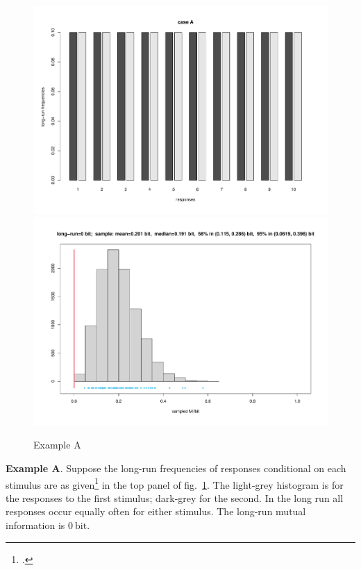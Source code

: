 \documentclass[\ifafour a4paper,12pt,\else a5paper,10pt,\fi%
onecolumn,oneside,article,%
british%
]{memoir}
\theoremstyle{remark}
\theoremstyle{innote}
\newcommand*{\citep}{\footcites}
\renewcommand*{\|}[1][]{\nonscript\,#1\vert\nonscript\;\mathopen{}}
\renewcommand*{\=}{\TextOrMath\texteq\eq}
\newcommand*{\fig}{fig.}%
\newcommand*{\bit}{\mathrm{bit}}
\begin{document}
\begin{figure}[p]%
\centering\includegraphics[width=\linewidth]{scripts/resp_caseA.pdf}\\%
\includegraphics[width=\linewidth]{scripts/histo_caseA.pdf}\\
\caption{Example A}\label{fig:resp_caseA}
\end{figure}%
\textbf{Example A}. Suppose the long-run frequencies of responses conditional
on each stimulus are as given\citep[as the example
in][]{panzerietal2007} in the top panel of \fig~\ref{fig:resp_caseA}. The
light-grey histogram is for the responses to the first stimulus;
dark-grey for the second. In the long run all responses occur equally
often for either stimulus. The long-run mutual information is $0\:\bit$.
\end{document}
